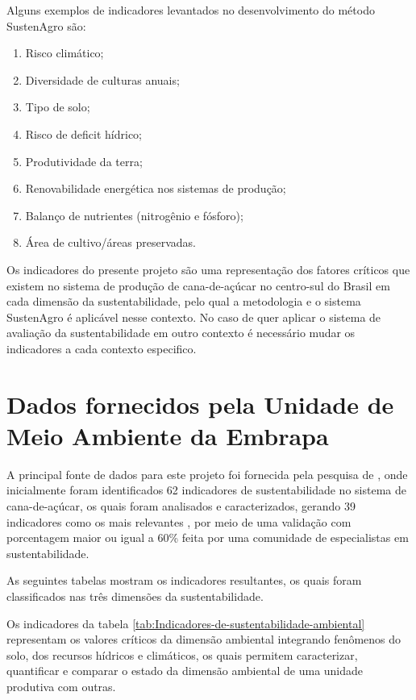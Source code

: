 Alguns exemplos de indicadores levantados no desenvolvimento do método
SustenAgro são: 
\begin{enumerate}
\item Risco climático; 
\item Diversidade de culturas anuais; 
\item Tipo de solo; 
\item Risco de deficit hídrico; 
\item Produtividade da terra; 
\item Renovabilidade energética nos sistemas de produção; 
\item Balanço de nutrientes (nitrogênio e fósforo); 
\item Área de cultivo/áreas preservadas.
\end{enumerate}
Os indicadores do presente projeto são uma representação dos fatores
críticos que existem no sistema de produção de cana-de-açúcar no centro-sul
do Brasil em cada dimensão da sustentabilidade, pelo qual a metodologia
e o sistema SustenAgro é aplicável nesse contexto. No caso de quer
aplicar o sistema de avaliação da sustentabilidade em outro contexto
é necessário mudar os indicadores a cada contexto especifico. 

\section{Dados fornecidos pela Unidade de Meio Ambiente da Embrapa }

A principal fonte de dados para este projeto foi fornecida pela pesquisa
de \citet{oliveira:2013}, onde inicialmente foram identificados 62
indicadores de sustentabilidade no sistema de cana-de-açúcar, os quais
foram analisados e caracterizados, gerando 39 indicadores como os
mais relevantes \citep{BRUMATTI:2015}, por meio de uma validação
com porcentagem maior ou igual a 60\% feita por uma comunidade de
especialistas em sustentabilidade.

As seguintes tabelas mostram os indicadores resultantes, os quais
foram classificados nas três dimensões da sustentabilidade.

Os indicadores da tabela \ref{tab:Indicadores-de-sustentabilidade-ambiental}
representam os valores críticos da dimensão ambiental integrando fenômenos
do solo, dos recursos hídricos e climáticos, os quais permitem caracterizar,
quantificar e comparar o estado da dimensão ambiental de uma unidade
produtiva com outras.

